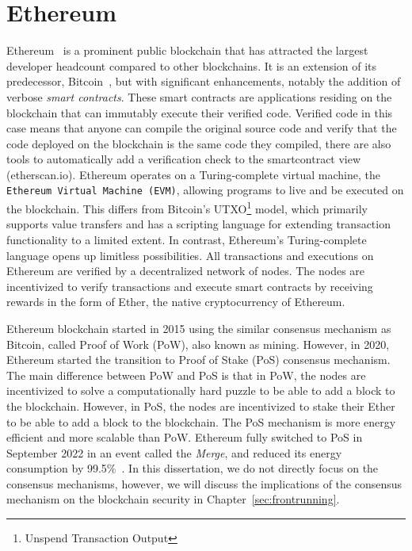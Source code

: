 \section{Ethereum}\label{ethereumbackground}

Ethereum~\cite{wood2014ethereum} is a prominent public blockchain that has attracted the largest developer headcount compared to other blockchains. It is an extension of its predecessor, Bitcoin~\cite{nakamoto2008bitcoin}, but with significant enhancements, notably the addition of verbose \textit{smart contracts}. These smart contracts are applications residing on the blockchain that can immutably execute their verified code. Verified code in this case means that anyone can compile the original source code and verify that the code deployed on the blockchain is the same code they compiled, there are also tools to automatically add a verification check to the smartcontract view (\eg etherscan.io). Ethereum operates on a Turing-complete virtual machine, the \texttt{Ethereum Virtual Machine (EVM)}, allowing programs to live and be executed on the blockchain. This differs from Bitcoin's UTXO\footnote{Unspend Transaction Output} model, which primarily supports value transfers and has a scripting language for extending transaction functionality to a limited extent. In contrast, Ethereum's Turing-complete language opens up limitless possibilities.  All transactions and executions on Ethereum are verified by a decentralized network of nodes. The nodes are incentivized to verify transactions and execute smart contracts by receiving rewards in the form of Ether, the native cryptocurrency of Ethereum. 

Ethereum blockchain started in 2015 using the similar consensus mechanism as Bitcoin, called Proof of Work (PoW), also known as mining. However, in 2020, Ethereum started the transition to Proof of Stake (PoS) consensus mechanism. The main difference between PoW and PoS is that in PoW, the nodes are incentivized to solve a computationally hard puzzle to be able to add a block to the blockchain. However, in PoS, the nodes are incentivized to stake their Ether to be able to add a block to the blockchain. The PoS mechanism is more energy efficient and more scalable than PoW. Ethereum fully switched to PoS in September 2022 in an event called the \textit{Merge}, and reduced its energy consumption by 99.5\%~\cite{themerge}. In this dissertation, we do not directly focus on the consensus mechanisms, however, we will discuss the implications of the consensus mechanism on the blockchain security in Chapter~\ref{sec:frontrunning}. 


